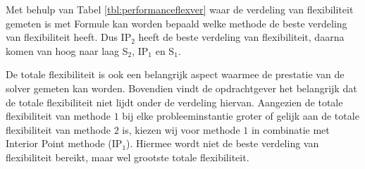 Met behulp van Tabel \ref{tbl:performanceflexver} waar de verdeling van flexibiliteit gemeten is met Formule \label{eq:mse} kan worden bepaald welke methode de beste verdeling van flexibiliteit heeft. Dus IP$_2$ heeft de beste verdeling van flexibiliteit, daarna komen van hoog naar laag S$_2$, IP$_1$ en S$_1$. 

De totale flexibiliteit is ook een belangrijk aspect waarmee de prestatie van de solver gemeten kan worden. Bovendien vindt de opdrachtgever het belangrijk dat de totale flexibiliteit niet lijdt onder de verdeling hiervan. Aangezien de totale flexibiliteit van methode $1$ bij elke probleeminstantie groter of gelijk aan de totale flexibiliteit van methode $2$ is, kiezen wij voor methode $1$ in combinatie met Interior Point methode (IP$_1$). Hiermee wordt niet de beste verdeling van flexibiliteit bereikt, maar wel grootste totale flexibiliteit.
